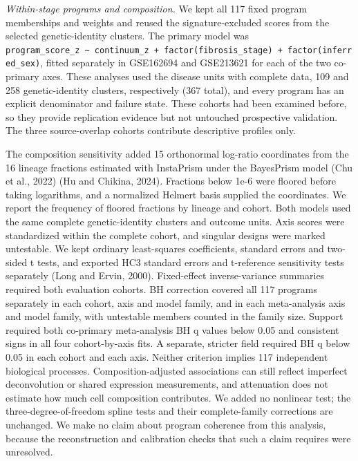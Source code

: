 \emph{Within-stage programs and composition.} We kept all 117 fixed program memberships and weights and reused the signature-excluded scores from the selected genetic-identity clusters. The primary model was \texttt{program\_\allowbreak{}score\_\allowbreak{}z\ \textasciitilde{}\ continuum\_\allowbreak{}z\ +\ factor(fibrosis\_\allowbreak{}stage)\ +\ factor(inferred\_\allowbreak{}sex)}, fitted separately in GSE162694 and GSE213621 for each of the two co-primary axes. These analyses used the disease units with complete data, 109 and 258 genetic-identity clusters, respectively (367 total), and every program has an explicit denominator and failure state. These cohorts had been examined before, so they provide replication evidence but not untouched prospective validation. The three source-overlap cohorts contribute descriptive profiles only.

The composition sensitivity added 15 orthonormal log-ratio coordinates from the 16 lineage fractions estimated with InstaPrism under the BayesPrism model (Chu et al., 2022) (Hu and Chikina, 2024). Fractions below 1e-6 were floored before taking logarithms, and a normalized Helmert basis supplied the coordinates. We report the frequency of floored fractions by lineage and cohort. Both models used the same complete genetic-identity clusters and outcome units. Axis scores were standardized within the complete cohort, and singular designs were marked untestable. We kept ordinary least-squares coefficients, standard errors and two-sided t tests, and exported HC3 standard errors and t-reference sensitivity tests separately (Long and Ervin, 2000). Fixed-effect inverse-variance summaries required both evaluation cohorts. BH correction covered all 117 programs separately in each cohort, axis and model family, and in each meta-analysis axis and model family, with untestable members counted in the family size. Support required both co-primary meta-analysis BH q values below 0.05 and consistent signs in all four cohort-by-axis fits. A separate, stricter field required BH q below 0.05 in each cohort and each axis. Neither criterion implies 117 independent biological processes. Composition-adjusted associations can still reflect imperfect deconvolution or shared expression measurements, and attenuation does not estimate how much cell composition contributes. We added no nonlinear test; the three-degree-of-freedom spline tests and their complete-family corrections are unchanged. We make no claim about program coherence from this analysis, because the reconstruction and calibration checks that such a claim requires were unresolved.

